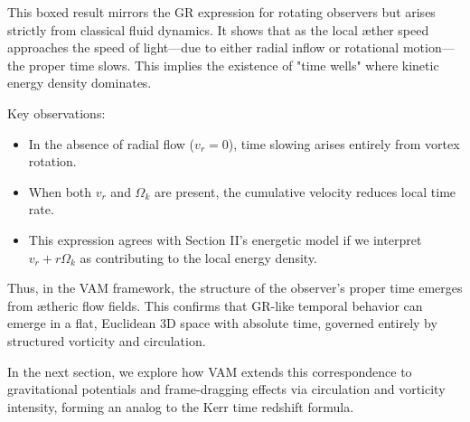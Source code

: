 This boxed result mirrors the GR expression for rotating observers but arises strictly from classical fluid dynamics. It shows that as the local æther speed approaches the speed of light—due to either radial inflow or rotational motion—the proper time slows. This implies the existence of "time wells" where kinetic energy density dominates.

Key observations:

\begin{itemize}
\item In the absence of radial flow (\(v_r = 0\)), time slowing arises entirely from vortex rotation.
\item When both \(v_r\) and \(\Omega_k\) are present, the cumulative velocity reduces local time rate.
\item This expression agrees with Section II's energetic model if we interpret \(v_r + r\Omega_k\) as contributing to the local energy density.
\end{itemize}

Thus, in the VAM framework, the structure of the observer’s proper time emerges from ætheric flow fields. This confirms that GR-like temporal behavior can emerge in a flat, Euclidean 3D space with absolute time, governed entirely by structured vorticity and circulation.

In the next section, we explore how VAM extends this correspondence to gravitational potentials and frame-dragging effects via circulation and vorticity intensity, forming an analog to the Kerr time redshift formula.
